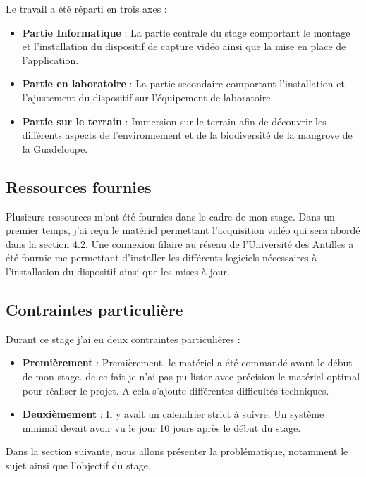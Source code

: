     \begin{flushleft}
        Le travail a été réparti en trois axes :
        \begin{itemize}
            \item \textbf{Partie Informatique} : La partie centrale du stage comportant le montage et l'installation du dispositif de capture vidéo ainsi que la mise en place de l'application.
            \item  \textbf{Partie en laboratoire} : La partie secondaire comportant l’installation et l’ajustement du dispositif sur l’équipement de laboratoire.
            \item  \textbf{Partie sur le terrain} : Immersion sur le terrain afin de découvrir les différents aspects de l'environnement et de la biodiversité de la mangrove de la Guadeloupe.
        \end{itemize}        
    \end{flushleft}

    \subsection{Ressources fournies}
    Plusieurs ressources m'ont été fournies dans le cadre de mon stage.
    Dans un premier temps, j'ai reçu le matériel permettant l'acquisition vidéo qui sera abordé dans la section 4.2.
    Une connexion filaire au réseau de l'Université des Antilles a été fournie me permettant d'installer les différents logiciels nécessaires à l'installation du dispositif ainsi que les mises à jour.

    \subsection{Contraintes particulière}
    Durant ce stage j'ai eu deux contraintes particulières :
    \begin{itemize}
        \item \textbf{Premièrement} : Premièrement, le matériel a été commandé avant le début de mon stage. de ce fait je n’ai pas pu lister avec précision le matériel optimal pour réaliser le projet. A cela s’ajoute différentes difficultés techniques.
        \item \textbf{Deuxièmement} : Il y avait un calendrier strict à suivre. Un système minimal devait avoir vu le jour 10 jours après le début du stage.
    \end{itemize}

    \vspace{0.5cm}

    Dans la section suivante, nous allons présenter la problématique, notamment le sujet ainsi que l'objectif du stage.

